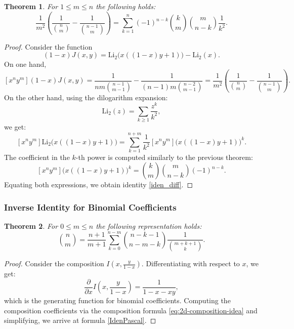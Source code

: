 \documentclass[12pt]{article}
\newtheorem{theorem}{Theorem}[section]
\begin{document}
\begin{theorem}
 For \( 1 \leq m \leq n \) the following holds:
\begin{equation}\label{iden_diff}
\frac{1}{m^2}\left(\frac{1}{\binom{n}{m}} - \frac{1}{\binom{n-1}{m}}\right)
= \sum_{k=1}^n (-1)^{n-k} \binom{k}{m}\binom{m}{n-k}\frac{1}{k^2}.
\end{equation}
\end{theorem}

\begin{proof} Consider the function
\[
(1-x)J(x,y) = \mathrm{Li}_2\!\bigl(x((1-x)y+1)\bigr) - \mathrm{Li}_2(x).
\]
On one hand,
\[
[x^n y^m](1-x)J(x,y) = \frac{1}{nm\binom{n-1}{m-1}} - \frac{1}{(n-1)m\binom{n-2}{m-1}}
= \frac{1}{m^2}\left(\frac{1}{\binom{n}{m}} - \frac{1}{\binom{n-1}{m}}\right).
\]
On the other hand, using the dilogarithm expansion:
\[
\mathrm{Li}_2(z) = \sum_{k\geq 1} \frac{z^k}{k^2},
\]
we get:
\[
[x^n y^m] \mathrm{Li}_2\!\bigl(x((1-x)y+1)\bigr)
= \sum_{k=1}^{n+m} \frac{1}{k^2} [x^n y^m] \bigl(x((1-x)y+1)\bigr)^k.
\]
The coefficient in the $k$-th power is computed similarly to the previous theorem:
\[
[x^n y^m] \bigl(x((1-x)y+1)\bigr)^k = \binom{k}{m}\binom{m}{n-k}(-1)^{n-k}.
\]
Equating both expressions, we obtain identity \eqref{iden_diff}.
\end{proof}

\subsubsection{Inverse Identity for Binomial Coefficients}

\begin{theorem}
 For \( 0 \leq m \leq n \) the following representation holds:
\begin{equation}\label{IdenPascal}
\binom{n}{m} = \frac{n+1}{m+1} \sum_{k=0}^{n-m}
\binom{n-k-1}{n-m-k} \frac{1}{\binom{m+k+1}{k}}.
\end{equation}
\end{theorem}

\begin{proof}
 Consider the composition \( I\!\left(x, \frac{y}{1-x}\right) \). Differentiating with respect to \( x \), we get:
\[
\frac{\partial}{\partial x} I\!\left(x, \frac{y}{1-x}\right) = \frac{1}{1-x-xy},
\]
which is the generating function for binomial coefficients. Computing the composition coefficients via the composition formula \ref{eq:2d-composition-idea} and simplifying, we arrive at formula \eqref{IdenPascal}.
\end{proof}
\end{document}
